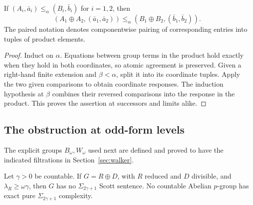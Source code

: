\documentclass[11pt]{article}
\begin{document}
\begin{lemma}\label{lem:products}
If $(A_i,\bar a_i)\leq_\alpha(B_i,\bar b_i)$ for $i=1,2$, then
\[
 (A_1\oplus A_2,(\bar a_1,\bar a_2))
 \leq_\alpha
 (B_1\oplus B_2,(\bar b_1,\bar b_2)).
\]
The paired notation denotes componentwise pairing of corresponding
entries into tuples of product elements.
\end{lemma}
\begin{proof}
Induct on $\alpha$. Equations between group terms in the product hold
exactly when they hold in both coordinates, so atomic agreement is
preserved. Given a right-hand finite extension and $\beta<\alpha$,
split it into its coordinate tuples. Apply the two given comparisons
to obtain coordinate responses. The induction hypothesis at $\beta$
combines their reversed comparisons into the response in the product.
This proves the assertion at successors and limits alike.
\end{proof}

\subsection{The obstruction at odd-form levels}
The explicit groups $B_\omega,W_\omega$ used next are defined and proved
to have the indicated filtrations in Section~\ref{sec:walker}.
\begin{theorem}
\label{thm:odd-obstruction}
Let $\gamma>0$ be countable. If $G=R\oplus D$, with $R$ reduced and
$D$ divisible, and $\lambda_R\ge\omega\gamma$, then $G$ has no
$\Sigma_{2\gamma+1}$ Scott sentence. No countable Abelian
$p$-group has exact pure $\Sigma_{2\gamma+1}$ complexity.
\end{theorem}
\end{document}

